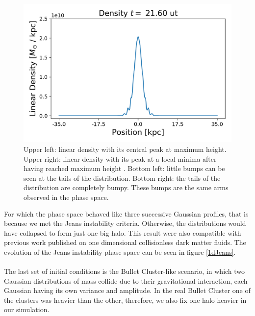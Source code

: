 \begin{figure}[h!]
    \includegraphics[scale=0.45]{imag/gaussD54.png}
    \caption{Upper left: linear density with its central peak at maximum height. Upper right: linear density with its peak at a local minima after having reached maximum height . Bottom left: little bumps can be seen at the tails of the distribution. Bottom right: the tails of the distribution are completely bumpy. These bumps are the same arms observed in the phase space.}
    \label{1dDens}
\end{figure}


For which the phase space behaved like three successive Gaussian profiles, that is because we met the Jeans instability criteria. Otherwise, the distributions would have collapsed to form just one big halo. This result were also compatible with previous work published on one dimensional collisionless dark matter fluids. The evolution of the Jeans instability phase space can be seen in figure \ref{1dJeans}.\\
\\The last set of initial conditions is the Bullet Cluster-like scenario, in which two Gaussian distributions of mass collide due to their gravitational interaction, each Gaussian having its own variance and amplitude.
In the real Bullet Cluster one of the clusters was heavier than the other, therefore, we also fix one halo heavier in our simulation.

